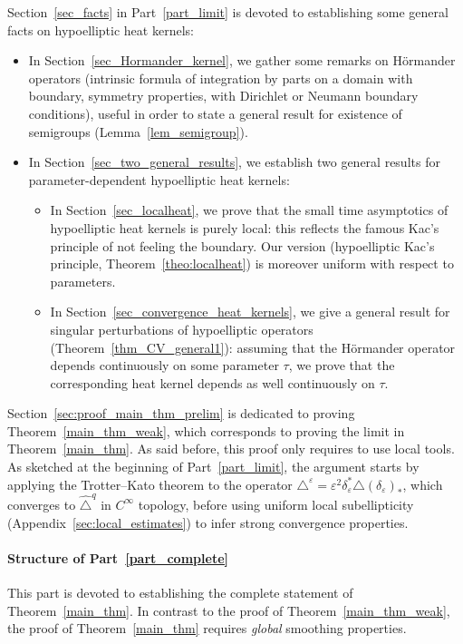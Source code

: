 \documentclass[AHL,Unicode,published]{cedram}
\begin{document}
Section~\ref{sec_facts} in Part~\ref{part_limit} is devoted to establishing some general facts on hypoelliptic heat kernels:
\begin{itemize}
\item In Section~\ref{sec_Hormander_kernel}, we gather some remarks on H\"ormander operators (intrinsic formula of integration by parts on a domain with boundary, symmetry properties, with Dirichlet or Neumann boundary conditions), useful in order to state a general result for existence of semigroups (Lemma~\ref{lem_semigroup}).
\item In Section~\ref{sec_two_general_results}, we establish two general results for parameter-dependent hypoelliptic heat kernels:
\begin{itemize}
\item In Section~\ref{sec_localheat}, we prove that the small time asymptotics of hypoelliptic heat kernels is purely local: this reflects the famous Kac's principle of not feeling the boundary. Our version (hypoelliptic Kac's principle, Theorem~\ref{theo:localheat}) is moreover uniform with respect to parameters.
\item In Section~\ref{sec_convergence_heat_kernels}, we give a general result for singular perturbations of hypoelliptic operators (Theorem~\ref{thm_CV_general1}): assuming that the H\"ormander operator depends continuously on some parameter $\tau$, we prove that the corresponding heat kernel depends as well continuously on $\tau$.
\end{itemize}
\end{itemize}
%

Section~\ref{sec:proof_main_thm_prelim} is dedicated to proving Theorem~\ref{main_thm_weak}, which corresponds to proving the limit in Theorem~\ref{main_thm}. As said before, this proof only requires to use local tools. As sketched at the beginning of Part~\ref{part_limit}, the argument starts by applying the Trotter--Kato theorem to the operator $\triangle^\varepsilon = \varepsilon^2 \delta_\varepsilon^*\triangle(\delta_\varepsilon)_*$, which converges to $\widehat{\triangle}^{q}$ in $C^\infty$ topology, before using uniform local subellipticity (Appendix~\ref{sec:local_estimates}) to infer strong convergence properties.


\goodbreak
\paragraph{Structure of Part~\ref{part_complete}}
This part is devoted to establishing the complete statement of Theorem~\ref{main_thm}. In contrast to the proof of Theorem~\ref{main_thm_weak}, the proof of Theorem~\ref{main_thm} requires \emph{global} smoothing properties.
\end{document}
